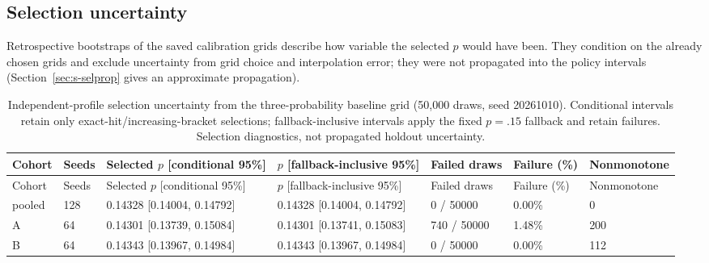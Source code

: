 \documentclass[11pt]{article}
\begin{document}
\subsection{Selection uncertainty}\label{sec:s-selection-uncertainty}
Retrospective bootstraps of the saved calibration grids describe how variable
the selected $p$ would have been. They condition on the already chosen grids and
exclude uncertainty from grid choice and interpolation error; they were not
propagated into the policy intervals (Section~\ref{sec:s-selprop} gives an
approximate propagation).

{\footnotesize\setlength{\tabcolsep}{3pt}
\begin{longtable}{p{.065\linewidth}p{.06\linewidth}p{.225\linewidth}p{.225\linewidth}p{.11\linewidth}p{.075\linewidth}p{.13\linewidth}}
\caption{Independent-profile selection uncertainty from the three-probability baseline grid (50,000 draws, seed 20261010). Conditional intervals retain only exact-hit/increasing-bracket selections; fallback-inclusive intervals apply the fixed $p=.15$ fallback and retain failures. Selection diagnostics, not propagated holdout uncertainty.}\label{tab:sel-independent}\\
\toprule
Cohort & Seeds & Selected $p$ [conditional 95\%] & $p$ [fallback-inclusive 95\%] & Failed draws & Failure (\%) & Nonmonotone\\
\midrule\endfirsthead
Cohort & Seeds & Selected $p$ [conditional 95\%] & $p$ [fallback-inclusive 95\%] & Failed draws & Failure (\%) & Nonmonotone\\
\midrule\endhead
pooled & 128 & 0.14328 [0.14004, 0.14792] & 0.14328 [0.14004, 0.14792] & 0 / 50000 & 0.00\% & 0\\
A & 64 & 0.14301 [0.13739, 0.15084] & 0.14301 [0.13741, 0.15083] & 740 / 50000 & 1.48\% & 200\\
B & 64 & 0.14343 [0.13967, 0.14984] & 0.14343 [0.13967, 0.14984] & 0 / 50000 & 0.00\% & 112\\
\bottomrule
\end{longtable}

}
\end{document}

